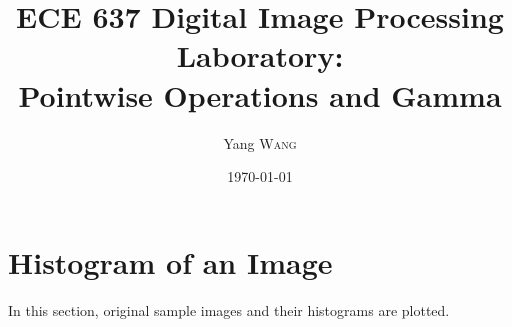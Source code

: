 \documentclass{article}
\title{ECE 637 Digital Image Processing Laboratory: \\ Pointwise Operations and
Gamma} %
\author{Yang \textsc{Wang}} %
\date{\today} %
\begin{document}
\maketitle %





\section{Histogram of an Image}
	In this section, original sample images and their histograms are plotted.
\end{document}
